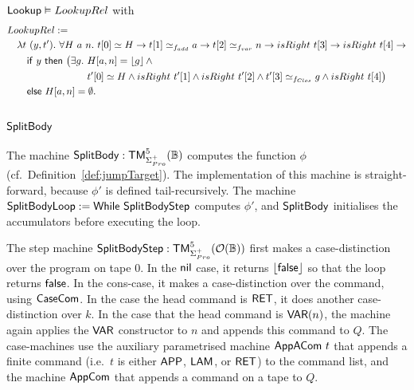 \begin{lemma}
  \label{lem:Lookup_Realise}
  $\mathsf{Lookup} \mathrel{\vDash} LookupRel$
  with
  \small
  \begin{alignat*}{1}
    & LookupRel := \\
    &\quad \lambda t~(y, t').~\forall H~a~n.~ t[0] \simeq H \rightarrow t[1] \simeq_{f_{add}} a \rightarrow t[2] \simeq_{f_{var}} n \rightarrow isRight~t[3] \rightarrow isRight~t[4] \rightarrow \\
    &\quad\quad \MS{if}~y~\MS{then}~\bigl(\exists g.~H[a,n] = \Some{g} \land \\
    &\quad\quad \phantom{\MS{if}~y~\MS{then}~\bigl(\exists g.~} t'[0] \simeq H \land isRight~t'[1] \land isRight~t'[2] \land t'[3] \simeq_{f_{Clos}} g \land isRight~t[4]\bigr) \\
    &\quad\quad \MS{else}~ H[a,n] = \None.
\end{alignat*}
\end{lemma}


\subsection{$\mathsf{SplitBody}$}
\label{sec:SplitBody}
%

The machine $\mathsf{SplitBody} : \mathsf{TM}_{\Sigma^+_{Pro}}^5(\mathbb{B})$ computes the function $\phi$ (cf.\ Definition~\ref{def:jumpTarget}).  The
implementation of this machine is straight-forward, because $\phi'$ is defined tail-recursively.  The machine
$\mathsf{SplitBodyLoop} := \mathsf{While}~\mathsf{SplitBodyStep}$ computes $\phi'$, and $\mathsf{SplitBody}$ initialises the accumulators before executing the loop.

The step machine $\mathsf{SplitBodyStep} : \mathsf{TM}_{\Sigma^+_{Pro}}^5(\mathcal{O}(\mathbb{B}))$ first makes a case-distinction over the program on tape $0$.  In the
$\mathsf{nil}$ case, it returns $\left\lfloor {\ensuremath{\mathsf{false}}} \right\rfloor$ so that the loop returns $\mathsf{false}$.  In the cons-case, it makes a case-distinction over the command, using
$\mathsf{CaseCom}$.  In the case the head command is $\mathsf{RET}$, it does another case-distinction over $k$.  In the case that the head command is
$\mathsf{VAR}(n)$, the machine again applies the $\mathsf{VAR}$ constructor to $n$ and appends this command to $Q$.  The case-machines use the auxiliary
parametrised machine $\mathsf{AppACom}~t$ that appends a finite command (i.e.\ $t$ is either $\mathsf{APP}$, $\mathsf{LAM}$, or $\mathsf{RET}$) to the command list,
and the machine $\mathsf{AppCom}$ that appends a command on a tape to $Q$.


